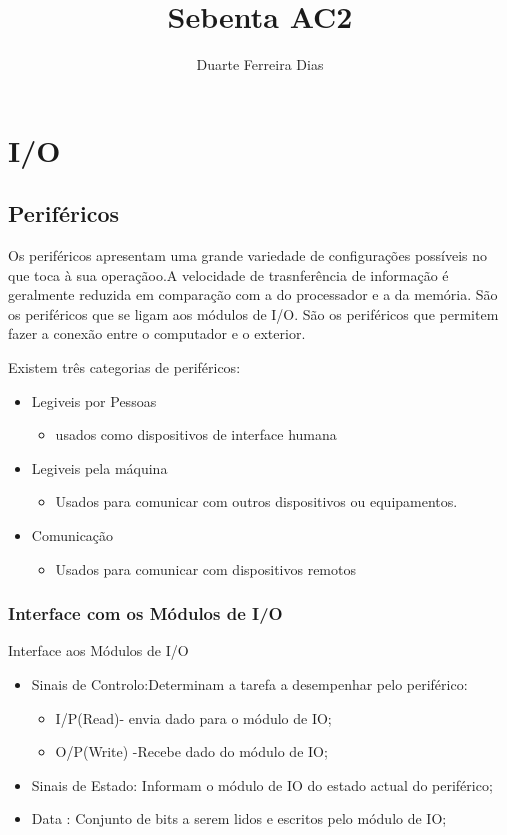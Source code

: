 \documentclass[10pt,a4paper]{paper}
\author{Duarte Ferreira Dias}
\title{Sebenta AC2}
\begin{document}
\maketitle
\newpage
	\section*{I/O}
	
	\subsection*{Periféricos}
	Os periféricos apresentam uma grande variedade de configurações possíveis no que toca à sua operaçãoo.A velocidade de trasnferência de informação é geralmente reduzida em comparação com a do processador e a da memória.
	São os periféricos que se ligam aos módulos de I/O.
	São os periféricos que permitem fazer a conexão entre o computador e o exterior.
	\begin{flushleft}
		Existem três categorias de periféricos:
	\end{flushleft}
	 \begin{itemize}
  		 \item  Legiveis por Pessoas
   			\begin{itemize}
     			\item usados como dispositivos de interface humana
			\end{itemize}     
       	\item  Legiveis pela máquina
       		\begin{itemize}
      			\item Usados para comunicar com outros dispositivos ou equipamentos. 
     		  \end{itemize}
	        \item  Comunicação
	       		\begin{itemize}
	       			\item Usados para comunicar com dispositivos remotos
	       		\end{itemize}
    	   \end{itemize}

	\subsubsection{Interface com os Módulos de I/O}
	Interface aos Módulos de I/O
	\begin{itemize}
		\item Sinais de Controlo:Determinam a tarefa a desempenhar pelo periférico:
		\begin{itemize}
		\item I/P(Read)- envia dado para o módulo de IO;
		\item O/P(Write) -Recebe dado do módulo de IO;
		\end{itemize}
		\item Sinais de Estado: Informam o módulo de IO do estado  actual do periférico;
		\item Data : Conjunto de bits a serem lidos e escritos pelo módulo de IO;
	\end{itemize}
	
\end{document}
